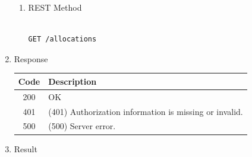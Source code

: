 \begin{enumerate}
\begin{enumerate}


\item REST Method

\begin{tcolorbox}[boxrule=0pt, frame empty]
\begin{verbatim} 

GET /allocations

\end{verbatim}
\end{tcolorbox}

\end{enumerate}

\item Response

\begin{table}[H]
\footnotesize

\begin{center}
\begin{tabular}{|c|l|} 
\hline
\rowcolor{lightgray}	Code 		& 	Description \\
\hline
200	 		&	OK \\
\hline
401			&	(401) Authorization information is missing or invalid. \\
\hline
500			&	(500) Server error. \\
\hline
\end{tabular}
\end{center}

\end{table}

\item Result

\begin{tcolorbox}[boxrule=0pt, frame empty]
\begin{verbatim}


\end{verbatim}
\end{tcolorbox}
\end{enumerate}
